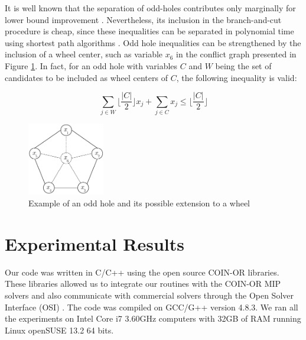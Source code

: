 \documentclass{endm}
\begin{document}
It is well known that the separation of odd-holes contributes only marginally for lower bound improvement \cite{Borndorfer1998,Mendez-Diaz2008}. Nevertheless, its inclusion in the branch-and-cut procedure is cheap, since these inequalities can be separated in polynomial time using shortest path algorithms \cite{Grotschel1993}. Odd hole inequalities can be strengthened by the inclusion of a wheel center, such as variable $x_{6}$ in the conflict graph presented in Figure \ref{figOH}. In fact, for an odd hole with variables $C$ and $W$ being the set of candidates to be included as wheel centers of $C$, the following inequality is valid:

\begin{equation}
	\sum_{j \in W} \lfloor \frac{|C|}{2} \rfloor x_{j} + \sum_{j \in C} x_{j} \leq \lfloor \frac{|C|}{2} \rfloor
\end{equation}

\begin{figure}
\begin{center}
	\includegraphics[width=0.3\textwidth]{oddHole.pdf}
	\caption{Example of an odd hole and its possible extension to a wheel} \label{figOH}
\end{center}
\end{figure}


\section{Experimental Results}\label{experiments}

Our code was written in C/C++ using the open source COIN-OR libraries. These libraries allowed us to integrate our routines with the COIN-OR MIP solvers \cite{Forrest2005,Linderoth2005,Ralphs2005} and also communicate with commercial solvers through the Open Solver Interface (OSI) \cite{Saltzman2004}. The code was compiled on GCC/G++ version 4.8.3. We ran all the experiments on Intel Core i7 3.60GHz computers with 32GB of RAM running Linux openSUSE 13.2 64 bits.
\end{document}
